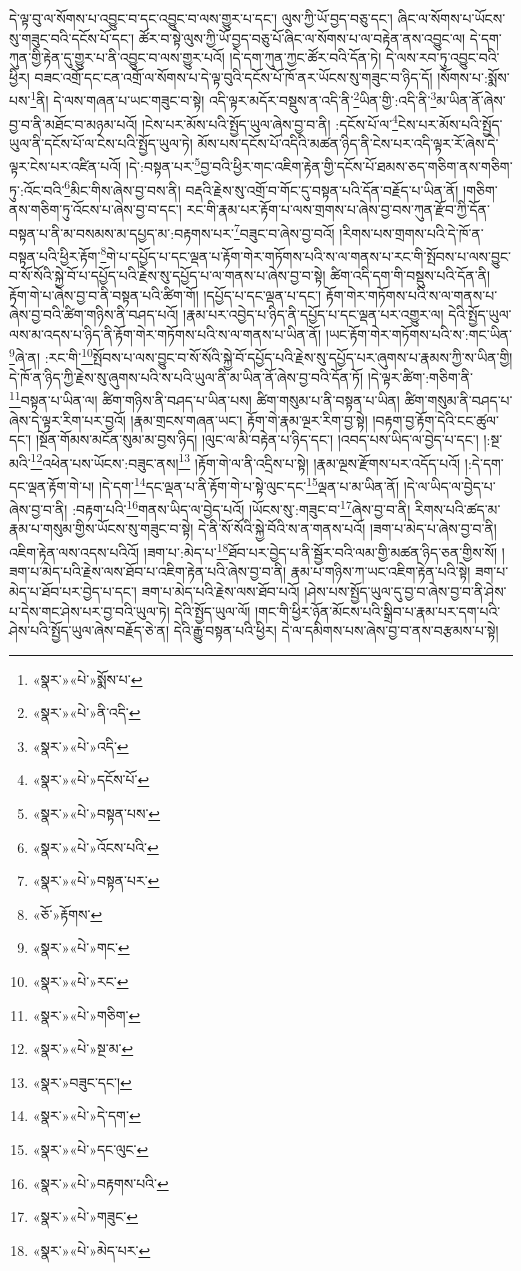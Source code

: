 དེ་ལྟ་བུ་ལ་སོགས་པ་འབྱུང་བ་དང་འབྱུང་བ་ལས་གྱུར་པ་དང་། ལུས་ཀྱི་ཡོ་བྱད་བཅུ་དང་། ཞིང་ལ་སོགས་པ་ཡོངས་སུ་གཟུང་བའི་དངོས་པོ་དང་། ཚོར་བ་སྟེ་ལུས་ཀྱི་ཡོ་བྱད་བཅུ་པོ་ཞིང་ལ་སོགས་པ་ལ་བརྟེན་ནས་འབྱུང་ལ། དེ་དག་ཀུན་གྱི་རྟེན་དུ་གྱུར་པ་ནི་འབྱུང་བ་ལས་གྱུར་པའོ། །དེ་དག་ཀུན་ཀྱང་ཚོར་བའི་དོན་ཏེ། དེ་ལས་རབ་ཏུ་འབྱུང་བའི་ཕྱིར། བཟང་འགྲོ་དང་ངན་འགྲོ་ལ་སོགས་པ་དེ་ལྟ་བུའི་དངོས་པོ་ཁོ་ནར་ཡོངས་སུ་གཟུང་བ་ཉིད་དོ། །སོགས་པ་:སྨོས་པས་\footnote{«སྣར་»«པེ་»སྨོས་པ་}ནི། དེ་ལས་གཞན་པ་ཡང་གཟུང་བ་སྟེ། འདི་ལྟར་མདོར་བསྡུས་ན་འདི་ནི་\footnote{«སྣར་»«པེ་»ནི་འདི་}ཡིན་གྱི་:འདི་ནི་\footnote{«སྣར་»«པེ་»འདི་}མ་ཡིན་ནོ་ཞེས་བྱ་བ་ནི་མཐོང་བ་མཉམ་པའོ། །ངེས་པར་མོས་པའི་སྤྱོད་ཡུལ་ཞེས་བྱ་བ་ནི། :དངོས་པོ་ལ་\footnote{«སྣར་»«པེ་»དངོས་པོ་}ངེས་པར་མོས་པའི་སྤྱོད་ཡུལ་ནི་དངོས་པོ་ལ་ངེས་པའི་སྤྱོད་ཡུལ་ཏེ། མོས་པས་དངོས་པོ་འདིའི་མཚན་ཉིད་ནི་ངེས་པར་འདི་ལྟར་རོ་ཞེས་དེ་ལྟར་ངེས་པར་འཛིན་པའོ། །དེ་:བསྟན་པར་\footnote{«སྣར་»«པེ་»བསྟན་པས་}བྱ་བའི་ཕྱིར་གང་འཇིག་རྟེན་གྱི་དངོས་པོ་ཐམས་ཅད་གཅིག་ནས་གཅིག་ཏུ་:འོང་བའི་\footnote{«སྣར་»«པེ་»འོངས་པའི་}མིང་གིས་ཞེས་བྱ་བས་ནི། བརྡའི་རྗེས་སུ་འགྲོ་བ་གོང་དུ་བསྟན་པའི་དོན་བརྗོད་པ་ཡིན་ནོ། །གཅིག་ནས་གཅིག་ཏུ་འོངས་པ་ཞེས་བྱ་བ་དང་། རང་གི་རྣམ་པར་རྟོག་པ་ལས་གྲགས་པ་ཞེས་བྱ་བས་ཀུན་རྫོབ་ཀྱི་དོན་བསྟན་པ་ནི་མ་བསམས་མ་དཔྱད་མ་:བརྟགས་པར་\footnote{«སྣར་»«པེ་»བསྟན་པར་}བཟུང་བ་ཞེས་བྱ་བའོ། །རིགས་པས་གྲགས་པའི་དེ་ཁོ་ན་བསྟན་པའི་ཕྱིར་རྟོག་\footnote{«ཅོ་»རྟོགས་}གེ་པ་དཔྱོད་པ་དང་ལྡན་པ་རྟོག་གེར་གཏོགས་པའི་ས་ལ་གནས་པ་རང་གི་སྤོབས་པ་ལས་བྱུང་བ་སོ་སོའི་སྐྱེ་བོ་པ་དཔྱོད་པའི་རྗེས་སུ་དཔྱོད་པ་ལ་གནས་པ་ཞེས་བྱ་བ་སྟེ། ཚིག་འདི་དག་གི་བསྡུས་པའི་དོན་ནི། རྟོག་གེ་པ་ཞེས་བྱ་བ་ནི་བསྟན་པའི་ཚིག་གོ། །དཔྱོད་པ་དང་ལྡན་པ་དང་། རྟོག་གེར་གཏོགས་པའི་ས་ལ་གནས་པ་ཞེས་བྱ་བའི་ཚིག་གཉིས་ནི་བཤད་པའོ། །རྣམ་པར་འབྱེད་པ་ཉིད་ནི་དཔྱོད་པ་དང་ལྡན་པར་འགྱུར་ལ། དེའི་སྤྱོད་ཡུལ་ལས་མ་འདས་པ་ཉིད་ནི་རྟོག་གེར་གཏོགས་པའི་ས་ལ་གནས་པ་ཡིན་ནོ། །ཡང་རྟོག་གེར་གཏོགས་པའི་ས་:གང་ཡིན་\footnote{«སྣར་»«པེ་»གང་}ཞེ་ན། :རང་གི་\footnote{«སྣར་»«པེ་»རང་}སྤོབས་པ་ལས་བྱུང་བ་སོ་སོའི་སྐྱེ་བོ་དཔྱོད་པའི་རྗེས་སུ་དཔྱོད་པར་ཞུགས་པ་རྣམས་ཀྱི་ས་ཡིན་གྱི། དེ་ཁོ་ན་ཉིད་ཀྱི་རྗེས་སུ་ཞུགས་པའི་ས་པའི་ཡུལ་ནི་མ་ཡིན་ནོ་ཞེས་བྱ་བའི་དོན་ཏོ། །དེ་ལྟར་ཚིག་:གཅིག་ནི་\footnote{«སྣར་»«པེ་»གཅིག་}བསྟན་པ་ཡིན་ལ། ཚིག་གཉིས་ནི་བཤད་པ་ཡིན་པས། ཚིག་གསུམ་པ་ནི་བསྟན་པ་ཡིན། ཚིག་གསུམ་ནི་བཤད་པ་ཞེས་དེ་ལྟར་རིག་པར་བྱའོ། །རྣམ་གྲངས་གཞན་ཡང་། རྟོག་གེ་རྣམ་ལྔར་རིག་བྱ་སྟེ། །བརྟག་བྱ་རྟོག་དེའི་ངང་ཚུལ་དང་། །སྔོན་གོམས་མངོན་སུམ་མ་བྱས་ཉིད། །ལུང་ལ་མི་བརྟེན་པ་ཉིད་དང་། །འབད་པས་ཡིད་ལ་བྱེད་པ་དང་། །:སྔ་མའི་\footnote{«སྣར་»«པེ་»སྔ་མ་}འཕེན་པས་ཡོངས་:བཟུང་ནས།\footnote{«སྣར་»བཟུང་དང་།} །རྟོག་གེ་ལ་ནི་འདྲིས་པ་སྟེ། །རྣམ་ལྔས་རྫོགས་པར་འདོད་པའོ། །:དེ་དག་དང་ལྡན་རྟོག་གེ་པ། །དེ་དག་\footnote{«སྣར་»«པེ་»དེ་དག་}དང་ལྡན་པ་ནི་རྟོག་གེ་པ་སྟེ་ལུང་དང་\footnote{«སྣར་»«པེ་»དང་ལུང་}ལྡན་པ་མ་ཡིན་ནོ། །དེ་ལ་ཡིད་ལ་བྱེད་པ་ཞེས་བྱ་བ་ནི། :བརྟག་པའི་\footnote{«སྣར་»«པེ་»བརྟགས་པའི་}གནས་ཡིད་ལ་བྱེད་པའོ། །ཡོངས་སུ་:གཟུང་བ་\footnote{«སྣར་»«པེ་»གཟུང་}ཞེས་བྱ་བ་ནི། རིགས་པའི་ཚད་མ་རྣམ་པ་གསུམ་གྱིས་ཡོངས་སུ་གཟུང་བ་སྟེ། དེ་ནི་སོ་སོའི་སྐྱེ་བོའི་ས་ན་གནས་པའོ། །ཟག་པ་མེད་པ་ཞེས་བྱ་བ་ནི། འཇིག་རྟེན་ལས་འདས་པའིའོ། །ཟག་པ་:མེད་པ་\footnote{«སྣར་»«པེ་»མེད་པར་}ཐོབ་པར་བྱེད་པ་ནི་སྦྱོར་བའི་ལམ་གྱི་མཚན་ཉིད་ཅན་གྱིས་སོ། །ཟག་པ་མེད་པའི་རྗེས་ལས་ཐོབ་པ་འཇིག་རྟེན་པའི་ཞེས་བྱ་བ་ནི། རྣམ་པ་གཉིས་ཀ་ཡང་འཇིག་རྟེན་པའི་སྟེ། ཟག་པ་མེད་པ་ཐོབ་པར་བྱེད་པ་དང་། ཟག་པ་མེད་པའི་རྗེས་ལས་ཐོབ་པའོ། །ཤེས་པས་སྤྱོད་ཡུལ་དུ་བྱ་བ་ཞེས་བྱ་བ་ནི་ཤེས་པ་དེས་གང་ཤེས་པར་བྱ་བའི་ཡུལ་ཏེ། དེའི་སྤྱོད་ཡུལ་ལོ། །གང་གི་ཕྱིར་ཉོན་མོངས་པའི་སྒྲིབ་པ་རྣམ་པར་དག་པའི་ཤེས་པའི་སྤྱོད་ཡུལ་ཞེས་བརྗོད་ཅེ་ན། དེའི་རྒྱུ་བསྟན་པའི་ཕྱིར། དེ་ལ་དམིགས་པས་ཞེས་བྱ་བ་ནས་བརྩམས་པ་སྟེ། 